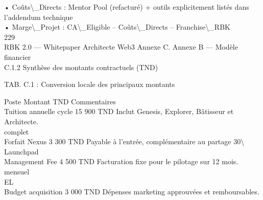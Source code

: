 • Coûts\textbackslash{}_Directs : Mentor Pool (refacturé) + outils explicitement listés dans l’addendum technique\\
\vspace{0.5em}
• Marge\textbackslash{}_Projet : CA\textbackslash{}_Eligible – Coûts\textbackslash{}_Directs – Franchise\textbackslash{}_RBK\\
\vspace{0.5em}
\vspace{0.5em}
\vspace{0.5em}
\vspace{0.5em}
229\\
RBK 2.0 — Whitepaper Architecte Web3                                                                                     Annexe C. Annexe B — Modèle financier\\
\vspace{0.5em}
\vspace{0.5em}
C.1.2 Synthèse des montants contractuels (TND)\\
\vspace{0.5em}
\vspace{0.5em}
\begin{center}\begin{tabular}TAB. C.1 : Conversion locale des principaux montants\end{tabular}\end{center}
\vspace{0.5em}
\vspace{0.5em}
Poste                        Montant TND           Commentaires\\
Tuition annuelle cycle       15 900 TND            Inclut Genesis, Explorer, Bâtisseur et Architecte.\\
complet\\
Forfait Nexus                3 300 TND             Payable à l’entrée, complémentaire au partage 30\textbackslash{}%
Launchpad\\
Management Fee               4 500 TND             Facturation fixe pour le pilotage sur 12 mois.\\
mensuel\\
\vspace{0.5em}
\vspace{0.5em}
\vspace{0.5em}
\vspace{0.5em}
EL\\
Budget acquisition           3 000 TND             Dépenses marketing approuvées et remboursables.\\
